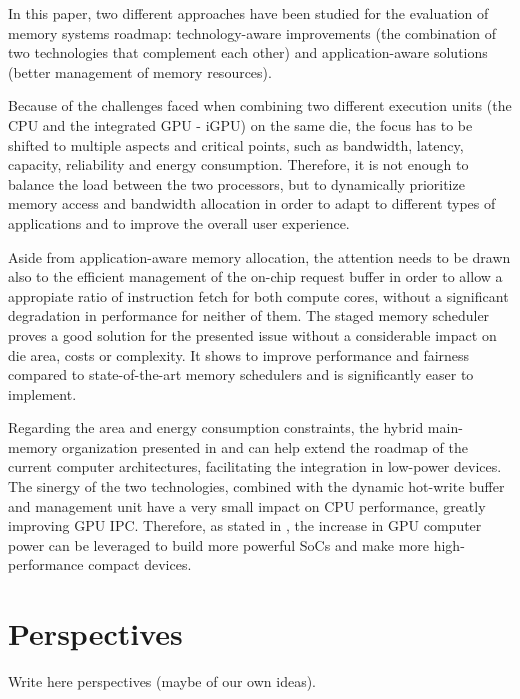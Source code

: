 \documentclass[12pt,journal,compsoc]{IEEEtran}
\begin{document}
In this paper, two different approaches have been studied for the evaluation of memory systems roadmap: technology-aware improvements (the combination of two technologies that complement each other)  and application-aware solutions (better management of memory resources). 

Because of the challenges faced when combining two different execution units (the CPU and the integrated GPU - iGPU) on the same die, the focus has to be shifted to multiple aspects and critical points, such as bandwidth, latency, capacity, reliability and energy consumption. Therefore, it is not enough to balance the load between the two processors, but to dynamically prioritize memory access \cite{LLC} and bandwidth allocation in order to adapt to different types of applications and to improve the overall user experience. 

Aside from application-aware memory allocation, the attention needs to be drawn also to the efficient management of the on-chip request buffer in order to allow a appropiate ratio of instruction fetch for both compute cores, without a significant degradation in performance for neither of them. The  staged memory scheduler proves a good solution for the presented issue without a considerable impact on die area, costs or complexity.  It shows to improve performance and fairness compared to state-of-the-art memory schedulers and is significantly easer to implement\cite{SmS}.

Regarding the area and energy consumption constraints, the hybrid main-memory organization presented in \cite{PRAM} and \cite{PDRAM} can help extend the roadmap of the current computer architectures, facilitating the integration in low-power devices. The sinergy of the two technologies, combined with the dynamic hot-write buffer and management unit have a very small impact on CPU performance, greatly improving GPU IPC. Therefore, as stated in \cite{PRAM}, the increase in GPU computer power can be leveraged to build more powerful SoCs and make more high-performance compact devices.

\section{Perspectives}
Write here perspectives (maybe of our own ideas). 



\ifCLASSOPTIONcompsoc

\ifCLASSOPTIONcaptionsoff
  \newpage
\fi





\newpage

\end{document}
